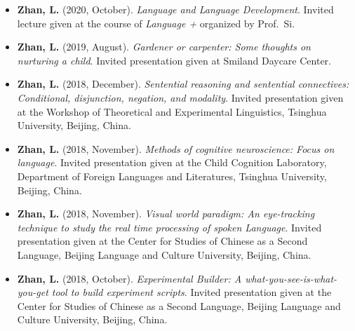 \documentclass[
  12pt,
]{article}
\begin{document}
\begin{itemize}
\item
  \textbf{Zhan, L.} (2020, October). \emph{Language and Language
  Development}. Invited lecture given at the course of \emph{Language +}
  organized by Prof.~Si.
  \href{http://likan.oss-cn-beijing.aliyuncs.com/Talks/Language_and_Language_Development.pdf}{
  \faFilePdf[regular] }
\item
  \textbf{Zhan, L.} (2019, August). \emph{Gardener or carpenter: Some
  thoughts on nurturing a child}. Invited presentation given at Smiland
  Daycare Center. \href{https://publications.likan.info/talks/parent/}{
  \footnotesize \faExternalLink* }
\item
  \textbf{Zhan, L.} (2018, December). \emph{Sentential reasoning and
  sentential connectives: Conditional, disjunction, negation, and
  modality}. Invited presentation given at the Workshop of Theoretical
  and Experimental Linguistics, Tsinghua University, Beijing, China.
  \href{https://publications.likan.info/Talks/Sentential_Reasoning_Sentential_Connectives.pdf}{
  \faFilePdf[regular] }
\item
  \textbf{Zhan, L.} (2018, November). \emph{Methods of cognitive
  neuroscience: Focus on language}. Invited presentation given at the
  Child Cognition Laboratory, Department of Foreign Languages and
  Literatures, Tsinghua University, Beijing, China.
  \href{https://publications.likan.info/Talks/MethodsCognNeurosciLang2018NOV.pdf}{
  \faFilePdf[regular] }
\item
  \textbf{Zhan, L.} (2018, November). \emph{Visual world paradigm: An
  eye-tracking technique to study the real time processing of spoken
  Language}. Invited presentation given at the Center for Studies of
  Chinese as a Second Language, Beijing Language and Culture University,
  Beijing, China.
  \href{https://publications.likan.info/Talks/Visual_World_Paradigm.pdf}{
  \faFilePdf[regular] }
\item
  \textbf{Zhan, L.} (2018, October). \emph{Experimental Builder: A
  what-you-see-is-what-you-get tool to build experiment scripts}.
  Invited presentation given at the Center for Studies of Chinese as a
  Second Language, Beijing Language and Culture University, Beijing,
  China.
  \href{https://publications.likan.info/Eyelink_Experiment_Builder_Training_Materials/}{
  \faFilePdf[regular] }
\end{itemize}
\end{document}
